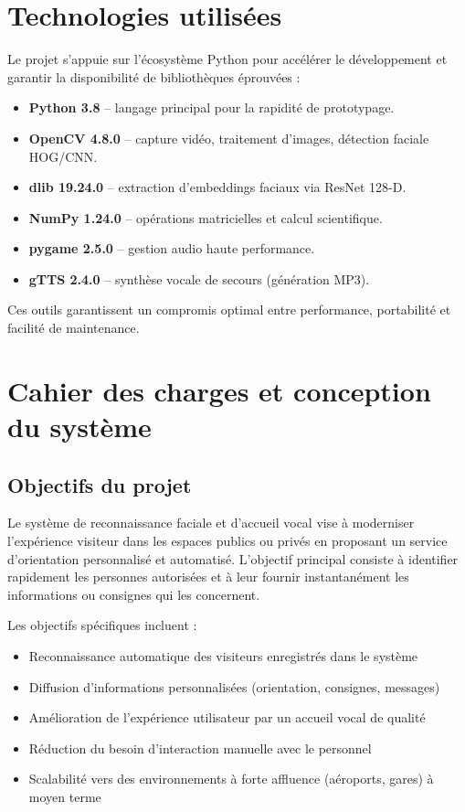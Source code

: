 \documentclass[12pt,a4paper]{article}
\begin{document}
\newpage

\section{Technologies utilisées}

Le projet s’appuie sur l’écosystème Python pour accélérer le développement et garantir la disponibilité de bibliothèques éprouvées :

\begin{itemize}
  \item \textbf{Python 3.8} – langage principal pour la rapidité de prototypage.
  \item \textbf{OpenCV 4.8.0} – capture vidéo, traitement d’images, détection faciale HOG/CNN.
  \item \textbf{dlib 19.24.0} – extraction d’embeddings faciaux via ResNet 128-D.
  \item \textbf{NumPy 1.24.0} – opérations matricielles et calcul scientifique.
  \item \textbf{pygame 2.5.0} – gestion audio haute performance.
  \item \textbf{gTTS 2.4.0} – synthèse vocale de secours (génération MP3).
\end{itemize}

Ces outils garantissent un compromis optimal entre performance, portabilité et facilité de maintenance.

\newpage

\section{Cahier des charges et conception du système}

\subsection{Objectifs du projet}

Le système de reconnaissance faciale et d’accueil vocal vise à moderniser l’expérience visiteur dans les espaces publics ou privés en proposant un service d’orientation personnalisé et automatisé. L’objectif principal consiste à identifier rapidement les personnes autorisées et à leur fournir instantanément les informations ou consignes qui les concernent.

Les objectifs spécifiques incluent :
\begin{itemize}
\item Reconnaissance automatique des visiteurs enregistrés dans le système
\item Diffusion d’informations personnalisées (orientation, consignes, messages)
\item Amélioration de l’expérience utilisateur par un accueil vocal de qualité
\item Réduction du besoin d’interaction manuelle avec le personnel
\item Scalabilité vers des environnements à forte affluence (aéroports, gares) à moyen terme
\end{itemize}
\end{document}
